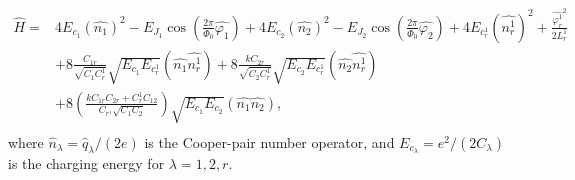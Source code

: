 \documentclass[reprint,superscriptaddress,preprintnumbers,longbibliography,
amsmath,amssymb,aps,floatfix,pra,twocolumn, tightenlines %
]{revtex4-2}
\begin{document}
\begin{equation}
\begin{aligned}
    \hat{H} = & 4E_{c_1}\left(\hat{n_1}\right)^2-E_{J_1}\cos\left(\frac{2\pi}{\Phi_0}\hat{\varphi_1}\right)
    +4E_{c_2}\left(\hat{n_2}\right)^2-E_{J_2}\cos\left(\frac{2\pi}{\Phi_0}\hat{\varphi_2}\right)    +4E_{c_r^1}\left(\hat{n_r^1}\right)^2+\frac{{\hat{\varphi_r^1}}^2}{2L_r^1}\\
    &+8\frac{C_{1r}}{\sqrt{C_1 C_r^1}}\sqrt{E_{c_1}E_{c_r^1}}\left(\hat{n_1}\hat{n_r^1}\right)+8\frac{k C_{2r}}{\sqrt{C_2 C_r^1}}\sqrt{E_{c_2}E_{c_r^1}}\left(\hat{n_2}\hat{n_r^1}\right)\\
    &+8\left(\frac{ k C_{1r} C_{2r} + C_r^1  C_{12}}{ C_{r^1} \sqrt{C_{1} C_{2} }}\right)\sqrt{E_{c_1}E_{c_2}}\left(\hat{n_1}\hat{n_2}\right),\\
\end{aligned}
\end{equation}
where \( \hat{n}_\lambda = \hat{q}_\lambda / (2e) \) is the Cooper-pair number operator, and \( E_{c_\lambda} = e^2 / (2 C_\lambda) \) is the charging energy for \( \lambda = 1, 2, r \).
\end{document}
